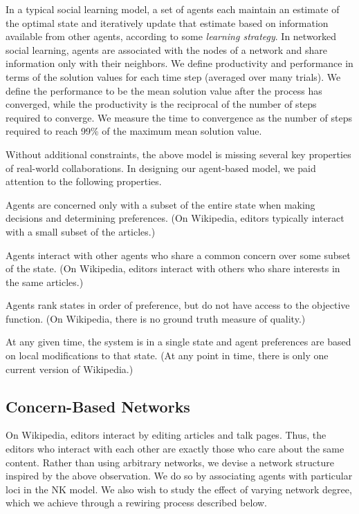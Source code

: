 In a typical social learning model,
a set of agents each maintain an estimate of the optimal state
and iteratively update that estimate based on information available from other agents,
according to some {\em learning strategy}.
In networked social learning,
agents are associated with the nodes of a network and share information
only with their neighbors.
We define productivity and performance in terms of the solution values for each time step
(averaged over many trials).
We define the performance to be the mean solution value after the process has converged,
while the productivity is the reciprocal of the number of steps required to converge.
We measure the time to convergence as the number of steps required to reach 99\% of the maximum
mean solution value.

Without additional constraints,
the above model is missing
several key properties of real-world collaborations.
In designing our agent-based model, we paid attention to the
following properties.
\begin{description}
\setlength\itemsep{0pt}
\item[Limited concern.] Agents are concerned only with a subset of the entire
state when making decisions and determining preferences.
(On Wikipedia, editors typically interact with a small subset of the articles.)
\item[Concern-based network.] Agents interact with other agents who share a
common concern over some subset of the state.
(On Wikipedia, editors interact with others who share interests in the same articles.)
\item[Unknown objective.] Agents rank states in order of preference,
but do not have access to the objective function.
(On Wikipedia, there is no ground truth measure of quality.)
\item[Single source of truth.] At any given time, the system is in a single state
and agent preferences are based on local modifications to that state.
(At any point in time, there is only one current version of Wikipedia.)
\end{description}

\subsection{Concern-Based Networks}

On Wikipedia, editors interact by editing articles and talk pages.
Thus, the editors who interact with each other are exactly those who care about the same content.
Rather than using arbitrary networks,
we devise a network structure inspired by the above observation.
We do so by associating agents with particular loci in the NK model.
We also wish to study the effect of varying network degree,
which we achieve through a rewiring process described below.


